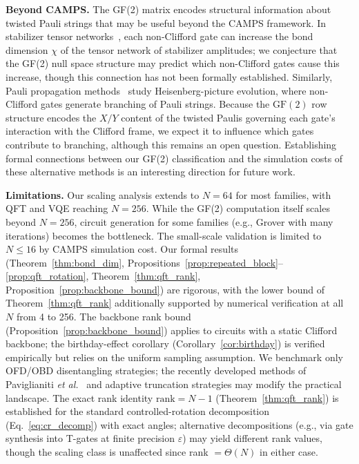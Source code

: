\documentclass[a4paper,twocolumn,11pt]{quantumarticle}
\begin{document}
\textbf{Beyond CAMPS.}
The GF(2) matrix encodes structural information about twisted Pauli strings that may be useful beyond the CAMPS framework.
In stabilizer tensor networks~\cite{MasotLlima2024}, each non-Clifford gate can increase the bond dimension $\chi$ of the tensor network of stabilizer amplitudes; we conjecture that the GF(2) null space structure may predict which non-Clifford gates cause this increase, though this connection has not been formally established.
Similarly, Pauli propagation methods~\cite{PauliProp2019} study Heisenberg-picture evolution, where non-Clifford gates generate branching of Pauli strings. Because the $\mathrm{GF}(2)$ row structure encodes the $X/Y$ content of the twisted Paulis governing each gate's interaction with the Clifford frame, we expect it to influence which gates contribute to branching, although this remains an open question.
Establishing formal connections between our GF(2) classification and the simulation costs of these alternative methods is an interesting direction for future work.

\textbf{Limitations.}
Our scaling analysis extends to $N = 64$ for most families, with QFT and VQE reaching $N = 256$.
While the GF(2) computation itself scales beyond $N = 256$, circuit generation for some families (e.g., Grover with many iterations) becomes the bottleneck.
The small-scale validation is limited to $N \le 16$ by CAMPS simulation cost.
Our formal results (Theorem~\ref{thm:bond_dim}, Propositions~\ref{prop:repeated_block}--\ref{prop:qft_rotation}, Theorem~\ref{thm:qft_rank}, Proposition~\ref{prop:backbone_bound}) are rigorous, with the lower bound of Theorem~\ref{thm:qft_rank} additionally supported by numerical verification at all $N$ from 4 to 256.
The backbone rank bound (Proposition~\ref{prop:backbone_bound}) applies to circuits with a static Clifford backbone; the birthday-effect corollary (Corollary~\ref{cor:birthday}) is verified empirically but relies on the uniform sampling assumption.
We benchmark only OFD/OBD disentangling strategies; the recently developed methods of Paviglianiti \emph{et al.}~\cite{Paviglianiti2024} and adaptive truncation strategies may modify the practical landscape.
The exact rank identity $\mathrm{rank} = N - 1$ (Theorem~\ref{thm:qft_rank}) is established for the standard controlled-rotation decomposition (Eq.~\eqref{eq:cr_decomp}) with exact angles; alternative decompositions (e.g., via gate synthesis into T-gates at finite precision $\varepsilon$) may yield different rank values, though the scaling class is unaffected since rank $= \Theta(N)$ in either case.
\end{document}
